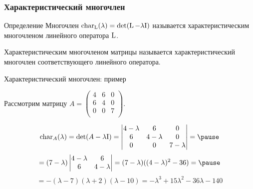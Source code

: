  \begin{frame}
     \frametitle{Характеристический многочлен}

     \begin{block}{Определение}
         Многочлен $\operatorname{char}_{\operatorname{L}}(\lambda) = \det (\operatorname{L} - \lambda \mathrm{I})$ называется
         \alert{характеристическим многочленом} линейного оператора $\operatorname{L}$.
     \end{block}

     \pause

     Характеристическим многочленом матрицы называется характеристический многочлен соответствующего линейного оператора.
    
 \end{frame}


 \begin{frame}{Характеристический многочлен: пример}

    Рассмотрим матрицу $A = \begin{pmatrix}
        4 & 6 & 0 \\
        6 & 4 & 0 \\
        0 & 0 & 7 \\
    \end{pmatrix}.$

    \pause
    \[
    \charp_A(\lambda) = \det (A - \lambda \Id) = \begin{vmatrix}
4-\lambda & 6 & 0 \\
6 & 4-\lambda & 0 \\
0 & 0 & 7-\lambda \\        
    \end{vmatrix} = \pause
    \]
    \[ = (7-\lambda) \begin{vmatrix}
4-\lambda & 6  \\
6 & 4-\lambda \\
\end{vmatrix} = (7-\lambda)((4-\lambda)^2 - 36) = \pause
\]
\[
 = -(\lambda - 7)(\lambda + 2)(\lambda - 10) = 
 -\lambda^3  + 15\lambda^2   -36 \lambda  - 140  
    \]

 \end{frame}


